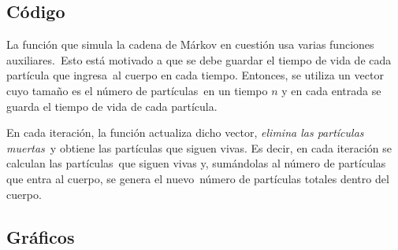 \documentclass[paper=letter, fontsize=12pt]{scrartcl} %
\numberwithin{equation}{section} %
\numberwithin{figure}{section} %
\numberwithin{table}{section} %
\begin{document}
\subsection{Código}

La función que simula la cadena de Márkov en cuestión usa varias funciones auxiliares.\
Esto está motivado a que se debe guardar el tiempo de vida de cada partícula que ingresa\
al cuerpo en cada tiempo. Entonces, se utiliza un vector cuyo tamaño es el número de partículas\
en un tiempo $n$ y en cada entrada se guarda el tiempo de vida de cada partícula.\par
En cada iteración, la función actualiza dicho vector, \textit{elimina las partículas muertas}\
y obtiene las partículas que siguen vivas. Es decir, en cada iteración se calculan las partículas\
que siguen vivas y, sumándolas al número de partículas que entra al cuerpo, se genera el nuevo\
número de partículas totales dentro del cuerpo.



\subsection{Gráficos}
\end{document}
